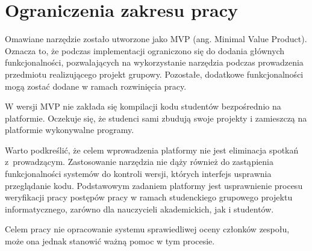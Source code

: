 \section{Ograniczenia zakresu pracy}

Omawiane narzędzie zostało utworzone jako MVP (ang. Minimal Value Product).
Oznacza to, że podczas implementacji ograniczono się do dodania głównych funkcjonalności, pozwalających na wykorzystanie narzędzia podczas prowadzenia przedmiotu realizującego projekt grupowy.
Pozostałe, dodatkowe funkcjonalności mogą zostać dodane w ramach rozwinięcia pracy.

W wersji MVP nie zakłada się kompilacji kodu studentów bezpośrednio na platformie.
Oczekuje się, że studenci sami zbudują swoje projekty i zamieszczą na platformie wykonywalne programy.

Warto podkreślić, że celem wprowadzenia platformy nie jest eliminacja spotkań z~prowadzącym.
Zastosowanie narzędzia nie dąży również do zastąpienia funkcjonalności systemów do kontroli wersji, których interfejs usprawnia przeglądanie kodu.
Podstawowym zadaniem platformy jest usprawnienie procesu weryfikacji pracy postępów pracy w ramach studenckiego grupowego projektu informatycznego, zarówno dla nauczycieli akademickich, jak i studentów.

Celem pracy nie opracowanie systemu sprawiedliwej oceny członków zespołu, może ona jednak stanowić ważną pomoc w tym procesie.




